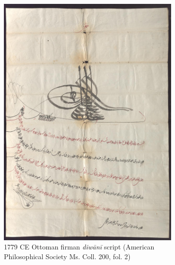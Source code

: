 \begin{figure}[h!tp]
\begin{subfigure}[t]{.48\textwidth}
		\includegraphics[width=\textwidth]{images/9676_0002_web.jpg}
		\caption{1779 CE Ottoman firman \emph{diwānī} script (American Philosophical Society Ms. Coll. 200, fol. 2)}
                \label{fig:ara_diwani}
        \end{subfigure}
	\hfill
	\begin{subfigure}[t]{.48\textwidth}

\end{subfigure}
\end{figure}
